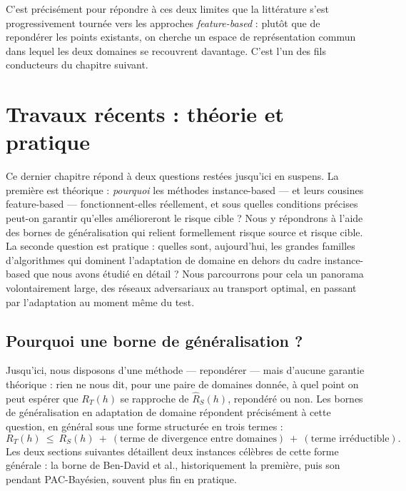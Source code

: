 \documentclass[11pt]{article}
\begin{document}
C'est précisément pour répondre à ces deux limites que la littérature s'est progressivement tournée vers
les approches \emph{feature-based} : plutôt que de repondérer les points existants, on cherche un espace
de représentation commun dans lequel les deux domaines se recouvrent davantage. C'est l'un des fils
conducteurs du chapitre suivant.

\section{Travaux récents : théorie et pratique}
\label{sec:recent}

Ce dernier chapitre répond à deux questions restées jusqu'ici en suspens. La première est théorique :
\emph{pourquoi} les méthodes instance-based --- et leurs cousines feature-based --- fonctionnent-elles
réellement, et sous quelles conditions précises peut-on garantir qu'elles amélioreront le risque cible ?
Nous y répondrons à l'aide des bornes de généralisation qui relient formellement risque source et risque
cible. La seconde question est pratique : quelles sont, aujourd'hui, les grandes familles d'algorithmes
qui dominent l'adaptation de domaine en dehors du cadre instance-based que nous avons étudié en détail ?
Nous parcourrons pour cela un panorama volontairement large, des réseaux adversariaux au transport
optimal, en passant par l'adaptation au moment même du test.

\subsection{Pourquoi une borne de généralisation ?}

Jusqu'ici, nous disposons d'une méthode --- repondérer --- mais d'aucune garantie théorique : rien ne
nous dit, pour une paire de domaines donnée, à quel point on peut espérer que $R_T(h)$ se rapproche de
$\widehat R_S(h)$, repondéré ou non. Les bornes de généralisation en adaptation de domaine répondent
précisément à cette question, en général sous une forme structurée en trois termes :
\[
R_T(h) \ \le\ R_S(h) \ + \ (\text{terme de divergence entre domaines}) \ + \ (\text{terme irréductible}).
\]
Les deux sections suivantes détaillent deux instances célèbres de cette forme générale : la borne de
Ben-David et al., historiquement la première, puis son pendant PAC-Bayésien, souvent plus fin en
pratique.
\end{document}
